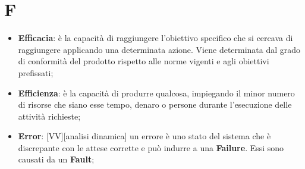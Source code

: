 % 
%
% 
%

\section{F}

\begin{itemize}
	\item \textbf{Efficacia}: è la capacità di raggiungere l'obiettivo specifico che si cercava di raggiungere applicando una determinata azione. \newline
Viene determinata dal grado di conformità del prodotto rispetto alle norme vigenti e agli obiettivi prefissati;

	\item \textbf{Efficienza}: è la capacità di produrre qualcosa, impiegando il minor numero di risorse che siano esse tempo, denaro o persone durante l'esecuzione delle attività richieste; \newline

	\item \textbf{Error}: [VV][analisi dinamica] un errore è uno stato del sistema che è discrepante con le attese corrette e può indurre a una \textbf{Failure}. Essi sono causati da un \textbf{Fault};
\end{itemize}